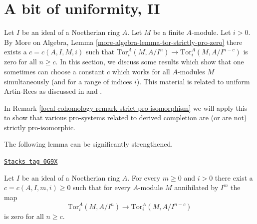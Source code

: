 \section{A bit of uniformity, II}
\label{local-cohomology-section-uniform-vanishing-bis}
Let $I$ be an ideal of a Noetherian ring $A$. Let $M$ be a finite
$A$-module. Let $i > 0$. By More on Algebra, Lemma
\ref{more-algebra-lemma-tor-strictly-pro-zero}
there exists a $c = c(A, I, M, i)$ such that
$\text{Tor}^A_i(M, A/I^n) \to \text{Tor}^A_i(M, A/I^{n - c})$
is zero for all $n \geq c$. In this section, we discuss
some results which show that one sometimes can choose
a constant $c$ which works for all $A$-modules $M$ simultaneously
(and for a range of indices $i$).
This material is related to uniform Artin-Rees as discussed in
\cite{Huneke-uniform} and \cite{AHS}.

\medskip\noindent
In Remark \ref{local-cohomology-remark-strict-pro-isomorphism} we will apply this to show that
various pro-systems related to derived completion are (or are not)
strictly pro-isomorphic.

\medskip\noindent
The following lemma can be significantly strengthened.

\begin{lemma}
\label{local-cohomology-lemma-maps-zero-fixed-torsion}
\href{https://stacks.math.columbia.edu/tag/0G9X}{\texttt{Stacks tag 0G9X}}

Let $I$ be an ideal of a Noetherian ring $A$. For every $m \geq 0$
and $i > 0$ there exist a $c = c(A, I, m, i) \geq 0$ such that
for every $A$-module $M$ annihilated by $I^m$ the map
$$
\text{Tor}^A_i(M, A/I^n) \to \text{Tor}^A_i(M, A/I^{n - c})
$$
is zero for all $n \geq c$.
\end{lemma}

